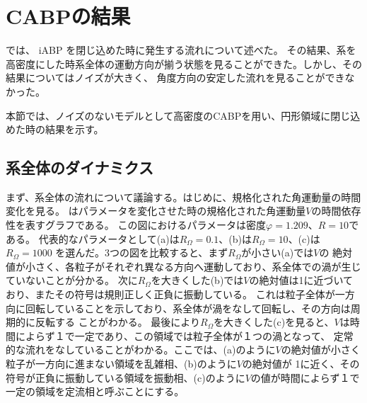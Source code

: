 \documentclass[/Users/ikedahajime/GitHub/reserch/master_report/thesis]{subfiles}
\begin{document}
\section{CABPの結果}\label{sec:result_cabp}
では、 iABP を閉じ込めた時に発生する流れについて述べた。
その結果、系を高密度にした時系全体の運動方向が揃う状態を見ることができた。しかし、その結果についてはノイズが大きく、
角度方向の安定した流れを見ることができなかった。

本節では、ノイズのないモデルとして高密度のCABPを用い、円形領域に閉じ込めた時の結果を示す。%
\subsection{系全体のダイナミクス}\label{subsec:CABPdinamicse}
まず、系全体の流れについて議論する。はじめに、規格化された角運動量の時間変化を見る。
はパラメータを変化させた時の規格化された角運動量$V$の時間依存性を表すグラフである。
この図におけるパラメータは密度$\varphi=1.209$、$R=10$である。
代表的なパラメータとして(a)は$R_{\Omega}=0.1$、(b)は$R_{\Omega}=10$、(c)は$R_{\Omega}=1000$
を選んだ。3つの図を比較すると、まず$R_{\Omega}$が小さい(a)では$V$の
絶対値が小さく、各粒子がそれぞれ異なる方向へ運動しており、系全体での渦が生じていないことが分かる。
次に$R_{\Omega}$を大きくした(b)では$V$の絶対値は1に近づいており、またその符号は規則正しく正負に振動している。%
これは粒子全体が一方向に回転していることを示しており、系全体が渦をなして回転し、その方向は周期的に反転する
ことがわかる。
最後により$R_{\Omega}$を大きくした(c)を見ると、$V$は時間によらず１で一定であり、この領域では粒子全体が１つの渦となって、
定常的な流れをなしていることがわかる。ここでは、(a)のように$V$の絶対値が小さく粒子が一方向に進まない領域を乱雑相、(b)のように$V$の絶対値が
1に近く、その符号が正負に振動している領域を振動相、(c)のように$V$の値が時間によらず１で一定の領域を定流相と呼ぶことにする。
\end{document}
